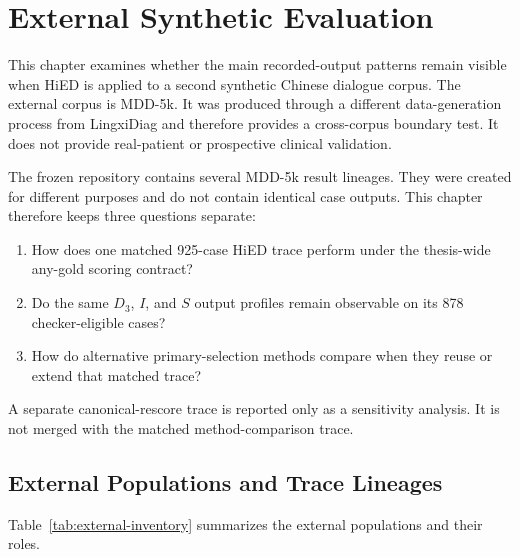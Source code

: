 \chapter{External Synthetic Evaluation}
\label{ch:external}

This chapter examines whether the main recorded-output patterns remain visible when HiED is applied to a second synthetic Chinese dialogue corpus. The external corpus is MDD-5k. It was produced through a different data-generation process from LingxiDiag and therefore provides a cross-corpus boundary test. It does not provide real-patient or prospective clinical validation.

The frozen repository contains several MDD-5k result lineages. They were created for different purposes and do not contain identical case outputs. This chapter therefore keeps three questions separate:

\begin{enumerate}
    \item How does one matched 925-case HiED trace perform under the thesis-wide any-gold scoring contract?
    \item Do the same \(D_3\), \(I\), and \(S\) output profiles remain observable on its 878 checker-eligible cases?
    \item How do alternative primary-selection methods compare when they reuse or extend that matched trace?
\end{enumerate}

A separate canonical-rescore trace is reported only as a sensitivity analysis. It is not merged with the matched method-comparison trace.

\section{External Populations and Trace Lineages}
\label{sec:external-populations}

Table~\ref{tab:external-inventory} summarizes the external populations and their roles.

